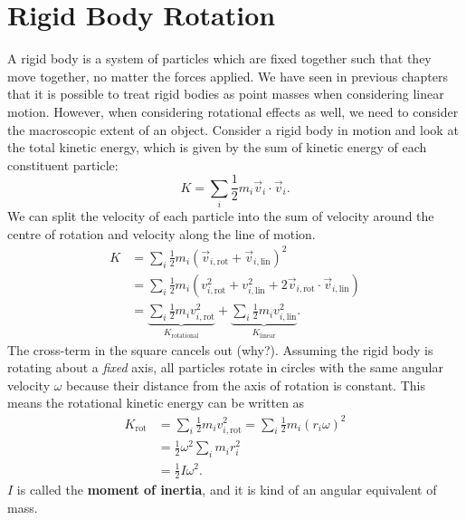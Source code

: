 \documentclass[../classical_mechanics.tex]{subfiles}
\begin{document}
    \section{Rigid Body Rotation}\label{sec:rigid-body-rotation}
        A rigid body is a system of particles which are fixed together such that they move together, no matter the forces applied.
        We have seen in previous chapters that it is possible to treat rigid bodies as point masses when considering linear motion.
        However, when considering rotational effects as well, we need to consider the macroscopic extent of an object.
        Consider a rigid body in motion and look at the total kinetic energy, which is given by the sum of kinetic energy of each constituent particle:
        \begin{equation}
            K=\sum_i\frac{1}{2}m_i\vec{v}_i\cdot\vec{v}_i.
        \end{equation}
        We can split the velocity of each particle into the sum of velocity around the centre of rotation and velocity along the line of motion.
        \begin{align}
            K&=\sum_i\frac{1}{2}m_i(\vec{v}_{i,\text{rot}}+\vec{v}_{i,\text{lin}})^2\\
            &=\sum_i\frac{1}{2}m_i(v_{i,\text{rot}}^2+v_{i,\text{lin}}^2+2\vec{v}_{i,\text{rot}}\cdot\vec{v}_{i,\text{lin}})\\
            &=\underbrace{\sum_i\frac{1}{2}m_iv_{i,\text{rot}}^2}_{K_\text{rotational}}+\underbrace{\sum_i\frac{1}{2}m_iv_{i,\text{lin}}^2}_{K_\text{linear}}.
        \end{align}
        The cross-term in the square cancels out (why?).
        Assuming the rigid body is rotating about a \textit{fixed} axis, all particles rotate in circles with the same angular velocity $\omega$ because their distance from the axis of rotation is constant.
        This means the rotational kinetic energy can be written as
        \begin{align}
            K_\text{rot}&=\sum_i\frac{1}{2}m_iv_{i,\text{rot}}^2=\sum_i\frac{1}{2}m_i(r_i\omega)^2\\
            &=\frac{1}{2}\omega^2\sum_i m_ir_i^2\\
            &=\frac{1}{2}I\omega^2.
        \end{align}
        $I$ is called the \textbf{moment of inertia}, and it is kind of an angular equivalent of mass.
\end{document}
